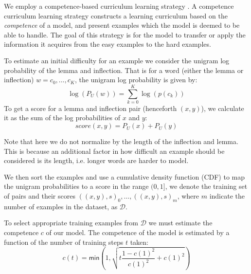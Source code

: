 \documentclass[11pt,a4paper]{article}
\begin{document}
We employ a competence-based curriculum learning strategy
\cite{DBLP:conf/acl/LiuLWC20, platanios2019competence}. A competence
curriculum learning strategy constructs a learning curriculum based on
the \textit{competence} of a model, and present examples which the
model is deemed to be able to handle. The goal of this
strategy is for the model to transfer or apply the information it
acquires from the easy examples to the hard examples.
 
To estimate an initial difficulty for an example we consider the
unigram log probability of the lemma and inflection. That is for a
word (either the lemma or inflection) $w = c_0, ..., c_K$, the unigram
log
probability is given by:
%
\begin{equation}
    \log (P_U(w)) = \sum_{k=0}^{K} \log(p(c_k))
\end{equation}
%
To get a score for a lemma and inflection pair (henceforth $(x,y)$),
we calculate it as the sum of the log probabilities of $x$ and $y$:
%
\begin{equation}
    score(x,y) = P_U(x) + P_U(y)
\end{equation}

Note that here we do not normalize by the length of the inflection and
lemma. This is because an additional factor in how difficult an
example should be considered is its length, i.e. longer words are
harder to model.

We then sort the examples and use a cumulative density function (CDF)
to map the unigram probabilities to a score in the range $(0, 1]$, we
denote the training set of pairs and their scores
$((x,y), s)_0, \ldots, ((x,y), s)_m$, where $m$ indicate the number of
examples in the dataset, as $\mathcal{D}$.

% 
%
To select appropriate training examples from $\mathcal{D}$ we must
estimate the competence $c$ of our model. The competence of the model
is estimated by a function of the number of training steps $t$ taken:
%
%
%
\begin{equation}
    c(t) = \mathsf{min}\left(1, \sqrt{t\frac{1-c(1)^2}{c(1)^2}+c(1)^2}\right)
\end{equation}
\end{document}
